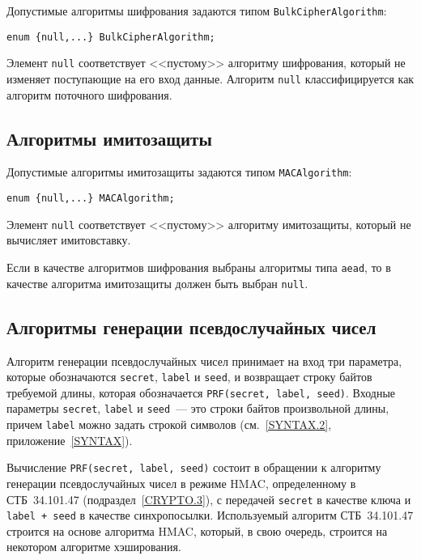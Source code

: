 Допустимые алгоритмы шифрования задаются типом 
\lstinline{BulkCipherAlgorithm}: 
\begin{lstlisting}
enum {null,...} BulkCipherAlgorithm; 
\end{lstlisting}

Элемент \lstinline{null} соответствует <<пустому>> алгоритму шифрования, 
который не изменяет поступающие на его вход данные. Алгоритм 
\lstinline{null} классифицируется как алгоритм поточного шифрования. 

\subsection{Алгоритмы имитозащиты}\label{CRYPTO.2.2}

Допустимые алгоритмы имитозащиты задаются типом \lstinline{MACAlgorithm}: 
\begin{lstlisting}
enum {null,...} MACAlgorithm;
\end{lstlisting}

Элемент \lstinline{null} соответствует <<пустому>> алгоритму имитозащиты, 
который не вычисляет имитовставку. 

Если в качестве алгоритмов шифрования выбраны алгоритмы типа \lstinline{aead}, 
то в качестве алгоритма имитозащиты должен быть выбран \lstinline{null}. 

\subsection{Алгоритмы генерации псевдослучайных чисел}\label{CRYPTO.2.3}

Алгоритм генерации псевдослучайных чисел принимает на вход три параметра, 
которые обозначаются \lstinline{secret}, \lstinline{label} и \lstinline{seed}, и 
возвращает строку байтов требуемой длины, которая обозначается 
\lstinline{PRF(secret, label, seed)}. Входные параметры 
\lstinline{secret}, \lstinline{label} и \lstinline{seed}~--- это строки байтов 
произвольной длины, причем \lstinline{label} можно задать строкой символов 
(см.~\ref{SYNTAX.2}, приложение~\ref{SYNTAX}). 

Вычисление \lstinline{PRF(secret, label, seed)} состоит в обращении к 
алгоритму генерации псевдослучайных чисел в режиме HMAC, определенному в 
СТБ~34.101.47 (подраздел~\ref{CRYPTO.3}), с передачей \lstinline{secret} в 
качестве ключа и \lstinline{label + seed} в качестве синхропосылки. 
Используемый алгоритм СТБ~34.101.47 строится на основе алгоритма HMAC, 
который, в свою очередь, строится на некотором алгоритме хэширования. 

